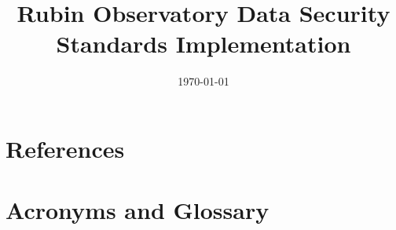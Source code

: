 \documentclass[DM,authoryear,toc]{lsstdoc}
\title{Rubin Observatory Data Security Standards Implementation}
\date{\today}
\begin{document}
\maketitle


\newpage
\appendix


\newpage
\section{References} \label{sec:bib}
\renewcommand{\refname}{} %


\section{Acronyms and Glossary} \label{sec:acronyms}
%
\printglossaries
\end{document}
